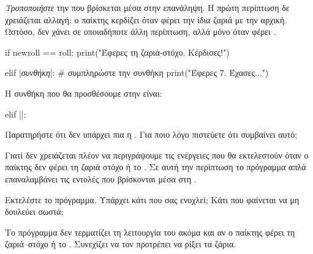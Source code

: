 \documentclass[a4paper,11pt,oneside]{book}
\begin{document}
\begin{step}
\emph{Τροποποιήστε} την  που βρίσκεται μέσα στην επανάληψη. Η πρώτη περίπτωση δε χρειάζεται αλλαγή: ο παίκτης κερδίζει όταν φέρει την ίδια ζαριά με την αρχική. Ωστόσο, δεν χάνει σε οποιαδήποτε άλλη περίπτωση, αλλά μόνο όταν φέρει . 

\begin{pyplain}
        if newroll == roll:
            print("Έφερες τη ζαριά-στόχο. Κέρδισες!")
\end{pyplain}
\begin{pynew}
        elif |\textrm{\textit{συνθήκη}}|:   # συμπληρώστε την συνθήκη
            print("Έφερες 7. Έχασες...")
\end{pynew}

\begin{answer}
Η συνθήκη που θα προσθέσουμε στην  είναι:

\begin{pyplain}
elif ||:
\end{pyplain}
\end{answer}

Παρατηρήστε ότι δεν υπάρχει πια η . Για ποιο λόγο πιστεύετε ότι συμβαίνει αυτό;

\begin{answer}
Γιατί δεν χρειάζεται πλέον να περιγράψουμε τις ενέργειες που θα εκτελεστούν όταν ο παίκτης δεν φέρει τη ζαριά στόχο ή το . Σε αυτή την περίπτωση το πρόγραμμα απλά επαναλαμβάνει τις εντολές που βρίσκονται μέσα στη .
\end{answer}

Εκτελέστε το πρόγραμμα. Υπάρχει κάτι που σας ενοχλεί; Κάτι που φαίνεται να μη δουλεύει σωστά;

\begin{answer}
Το πρόγραμμα δεν τερματίζει τη λειτουργία του ακόμα και αν ο παίκτης φέρει τη ζαριά--στόχο ή το . Συνεχίζει να τον προτρέπει να ρίξει τα ζάρια.
\end{answer}
\end{step}
\end{document}
